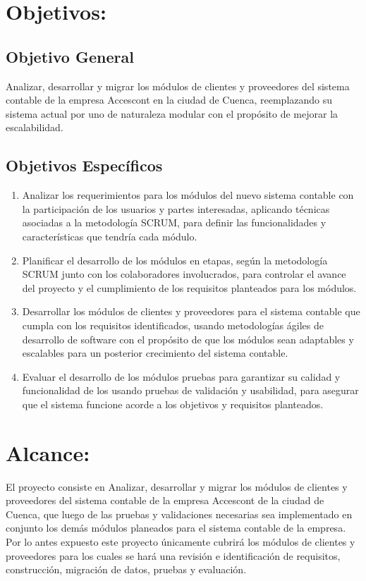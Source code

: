 \documentclass{article}
\begin{document}
\section{Objetivos:}

\subsection{Objetivo General}

Analizar, desarrollar y migrar los módulos de clientes y proveedores del sistema contable de la empresa Accescont en la ciudad de Cuenca, reemplazando su sistema actual por uno de naturaleza modular con el propósito de mejorar la escalabilidad.

\subsection{Objetivos Específicos}

\begin{enumerate}
    \item Analizar los requerimientos para los módulos del nuevo sistema contable con la participación de los usuarios y partes interesadas, aplicando técnicas asociadas a la metodología SCRUM, para definir las funcionalidades y características que tendría cada módulo.  
    
    \item Planificar el desarrollo de los módulos en etapas, según la metodología SCRUM junto con los colaboradores involucrados, para controlar el avance del proyecto y el cumplimiento de los requisitos planteados para los módulos.
    
    \item Desarrollar los módulos de clientes y proveedores para el sistema contable que cumpla con los requisitos identificados, usando metodologías ágiles de desarrollo de software con el propósito de que los módulos sean adaptables y escalables para un posterior crecimiento del sistema contable.  
    
    \item Evaluar el desarrollo de los módulos pruebas para garantizar su calidad y funcionalidad de los usando pruebas de validación y usabilidad, para asegurar que el sistema funcione acorde a los objetivos y requisitos planteados.  
\end{enumerate}


\section{Alcance:}
El proyecto consiste en Analizar, desarrollar y migrar los módulos de clientes y proveedores del sistema contable de la empresa Accescont de la ciudad de Cuenca, que luego de las pruebas y validaciones necesarias sea implementado en conjunto los demás módulos planeados para el sistema contable de la empresa. Por lo antes expuesto este proyecto únicamente cubrirá los módulos de clientes y proveedores para los cuales se hará una revisión e identificación de requisitos, construcción, migración de datos, pruebas y evaluación.
\end{document}
